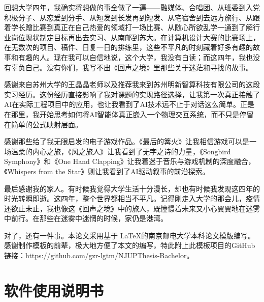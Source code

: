 \documentclass[bachelor]{njupthesis}
\begin{document}
回想大学四年，我确实将想做的事全做了一遍——融媒体、合唱团、从班委到入党积极分子、从恋爱到分手、从短发到长发再到短发、从宅宿舍到去远方旅行、从跟着学长蹭比赛到真正在自己热爱的领域打一场比赛、从随心所欲乱学一通到了解行业岗位现状制定目标再出去实习、从南邮到苏大。在计算机设计大赛的比赛场上，在无数次的项目、稿件、日复一日的排练里，这些不平凡的时刻藏着好多有趣的故事和有趣的人。现在我可以自信地说，这个大学，我没有白读；而这四年，我也没有辜负自己。没有你们，我写不出《回声之境》里那些关于迷茫和寻找的故事。

感谢来自苏州大学的王晶晶老师以及推荐我来到苏州明新智算科技有限公司的这段实习经历。这份经历直接影响了我对课题的实现路径选择，让我第一次真正接触了AI在实际工程项目中的应用，也让我看到了AI技术远不止于对话这么简单。正是在那里，我开始思考如何将AI智能体真正嵌入一个物理交互系统，而不只是停留在简单的公式映射层面。

感谢那些给了我无限启发的电子游戏作品。《最后的篝火》让我相信游戏可以是一场温柔的内心之旅，《风之旅人》让我看到了无字之诗的力量，《Songbird Symphony》和《One Hand Clapping》让我着迷于音乐与游戏机制的深度融合，《Whispers from the Star》则让我看到了AI驱动叙事的前沿探索。

最后感谢我的家人。有时候我觉得大学生活十分漫长，却也有时候我发现这四年的时光转瞬即逝。这四年，整个世界都相当不平凡。记得刚走入大学的那会儿，疫情还欲止未止，我也像这《回声之境》中的旅人，既憧憬着未来又小心翼翼地在迷雾中前行。在那些在迷雾中迷惘的时候，家仍是港湾。

对了，还有一件事。本论文采用基于 \LaTeX 的南京邮电大学本科论文模版编写。感谢制作模板的前辈，极大地方便了本文的编写，特此附上此模板项目的GitHub链接：https://github.com/gzr-lgtm/NJUPThesis-Bachelor。


\appendix
\renewcommand{\thechapter}{附录A}
\renewcommand{\thesection}{A.\arabic{section}}
\renewcommand{\thesubsection}{A.\arabic{section}.\arabic{subsection}}
\renewcommand{\thefigure}{A\arabic{figure}}
\setcounter{figure}{0}
\titleformat{\chapter}[block]
  {\fontsize{15pt}{15pt}\selectfont\heiti\thispagestyle{fancy}}{\thechapter \quad}{0pt}{}

\chapter{软件使用说明书}
\end{document}
